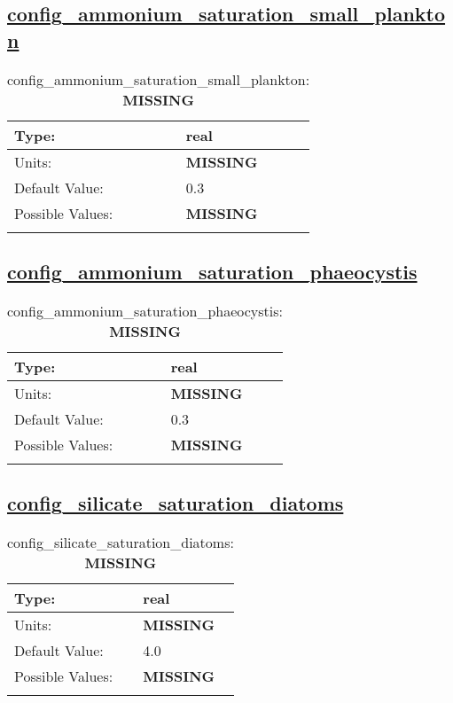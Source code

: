 \subsection[config\_ammonium\_saturation\_small\_plankton]{\hyperref[sec:nm_tab_biogeochemistry]{config\_ammonium\_saturation\_small\_plankton}}
\label{subsec:nm_sec_config_ammonium_saturation_small_plankton}
\begin{center}
\begin{longtable}{| p{2.0in} || p{4.0in} |}
    \hline
    Type: & real \\
    \hline
    Units: & {\bf \color{red} MISSING} \\
    \hline
    Default Value: & 0.3 \\
    \hline
    Possible Values: & {\bf \color{red} MISSING} \\
    \hline
    \caption{config\_ammonium\_saturation\_small\_plankton: {\bf \color{red} MISSING}}
\end{longtable}
\end{center}
\subsection[config\_ammonium\_saturation\_phaeocystis]{\hyperref[sec:nm_tab_biogeochemistry]{config\_ammonium\_saturation\_phaeocystis}}
\label{subsec:nm_sec_config_ammonium_saturation_phaeocystis}
\begin{center}
\begin{longtable}{| p{2.0in} || p{4.0in} |}
    \hline
    Type: & real \\
    \hline
    Units: & {\bf \color{red} MISSING} \\
    \hline
    Default Value: & 0.3 \\
    \hline
    Possible Values: & {\bf \color{red} MISSING} \\
    \hline
    \caption{config\_ammonium\_saturation\_phaeocystis: {\bf \color{red} MISSING}}
\end{longtable}
\end{center}
\subsection[config\_silicate\_saturation\_diatoms]{\hyperref[sec:nm_tab_biogeochemistry]{config\_silicate\_saturation\_diatoms}}
\label{subsec:nm_sec_config_silicate_saturation_diatoms}
\begin{center}
\begin{longtable}{| p{2.0in} || p{4.0in} |}
    \hline
    Type: & real \\
    \hline
    Units: & {\bf \color{red} MISSING} \\
    \hline
    Default Value: & 4.0 \\
    \hline
    Possible Values: & {\bf \color{red} MISSING} \\
    \hline
    \caption{config\_silicate\_saturation\_diatoms: {\bf \color{red} MISSING}}
\end{longtable}
\end{center}
